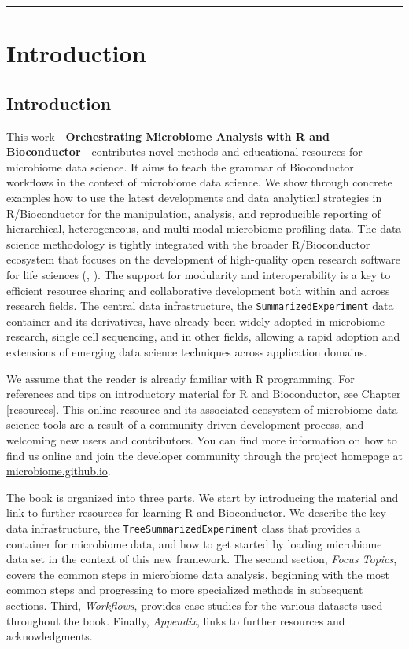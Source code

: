 \documentclass[
]{book}
\begin{document}
\begin{center}\rule{0.5\linewidth}{0.5pt}\end{center}

\hypertarget{part-introduction}{%
\part{Introduction}\label{part-introduction}}

\hypertarget{intro}{%
\chapter{Introduction}\label{intro}}

This work - \href{https://microbiome.github.io/OMA/}{\textbf{Orchestrating Microbiome Analysis with R and
Bioconductor}} \citep{OMA} - contributes novel
methods and educational resources for microbiome data science. It
aims to teach the grammar of Bioconductor workflows in the context of
microbiome data science. We show through concrete examples how to use
the latest developments and data analytical strategies in
R/Bioconductor for the manipulation, analysis, and reproducible
reporting of hierarchical, heterogeneous, and multi-modal microbiome
profiling data. The data science methodology is tightly integrated
with the broader R/Bioconductor ecosystem that focuses on the
development of high-quality open research software for life
sciences (\citet{Gentleman2004}, \citet{Huber2015}). The support for modularity and
interoperability is a key to efficient resource sharing and
collaborative development both within and across research fields. The
central data infrastructure, the \texttt{SummarizedExperiment} data container
and its derivatives, have already been widely adopted in microbiome
research, single cell sequencing, and in other fields, allowing a
rapid adoption and extensions of emerging data science techniques
across application domains.

We assume that the reader is already familiar with R programming. For
references and tips on introductory material for R and Bioconductor,
see Chapter \ref{resources}. This online resource and its associated
ecosystem of microbiome data science tools are a result of a
community-driven development process, and welcoming new users and
contributors. You can find more information on how to find us online
and join the developer community through the project homepage at
\href{https://microbiome.github.io}{microbiome.github.io}.

The book is organized into three parts. We start by introducing the
material and link to further resources for learning R and
Bioconductor. We describe the key data infrastructure, the
\texttt{TreeSummarizedExperiment} class that provides a container for
microbiome data, and how to get started by loading microbiome data set
in the context of this new framework. The second section, \emph{Focus
Topics}, covers the common steps in microbiome data analysis,
beginning with the most common steps and progressing to more
specialized methods in subsequent sections. Third, \emph{Workflows},
provides case studies for the various datasets used throughout the
book. Finally, \emph{Appendix}, links to further resources and
acknowledgments.
\end{document}
